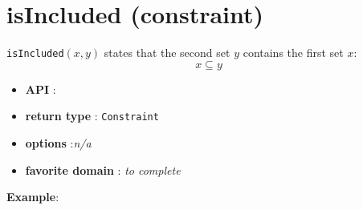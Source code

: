 \label{isincluded}
\hypertarget{isincluded}{}

\section{isIncluded (constraint)}\label{isincluded:isincludedconstraint}\hypertarget{isincluded:isincludedconstraint}{}
\begin{notedef}
  \texttt{isIncluded}$(x,y)$ states that the second set $y$ contains the first set $x$:
 $$x\subseteq y$$
\end{notedef}

\begin{itemize}
	\item \textbf{API} : 
	\item \textbf{return type} : \texttt{Constraint}
	\item \textbf{options} :\emph{n/a}
	\item \textbf{favorite domain} : \emph{to complete}
\end{itemize}

\textbf{Example}:

